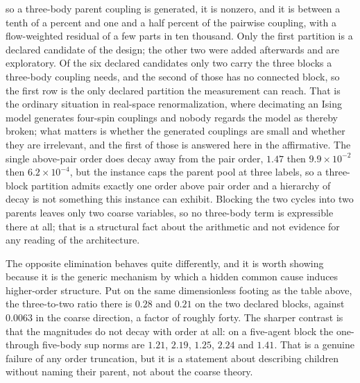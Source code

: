 \documentclass[11pt,letterpaper]{article}
\begin{document}
so a three-body parent coupling is generated, it is nonzero, and it is between a
tenth of a percent and one and a half percent of the pairwise coupling, with a
flow-weighted residual of a few parts in ten thousand. Only the first partition is
a declared candidate of the design; the other two were added afterwards and are
exploratory. Of the six declared candidates only two carry the three blocks a
three-body coupling needs, and the second of those has no connected block, so the
first row is the only declared partition the measurement can reach. That is the
ordinary situation in real-space renormalization,
where decimating an Ising model generates four-spin couplings and nobody regards
the model as thereby broken; what matters is whether the generated couplings are
small and whether they are irrelevant, and the first of those is answered here in
the affirmative. The single above-pair order does decay away from the pair order,
$1.47$ then $9.9\times10^{-2}$ then $6.2\times10^{-4}$, but the instance caps the
parent pool at three labels, so a three-block partition admits exactly one order
above pair order and a hierarchy of decay is not something this instance can
exhibit. Blocking the two cycles into two parents leaves only two coarse variables,
so no three-body term is expressible there at all; that is a structural fact about
the arithmetic and not evidence for any reading of the architecture.

The opposite elimination behaves quite differently, and it is worth showing because
it is the generic mechanism by which a hidden common cause induces higher-order
structure. Put on the same dimensionless footing as the table above, the
three-to-two ratio there is $0.28$ and $0.21$ on the two declared blocks, against
$0.0063$ in the coarse direction, a factor of roughly forty. The sharper contrast
is that the magnitudes do not decay with order at all: on a five-agent block the
one- through five-body sup norms are $1.21$, $2.19$, $1.25$, $2.24$ and $1.41$.
That is a genuine failure of any order truncation, but it is a statement about
describing children without naming their parent, not about the coarse theory.
\end{document}
